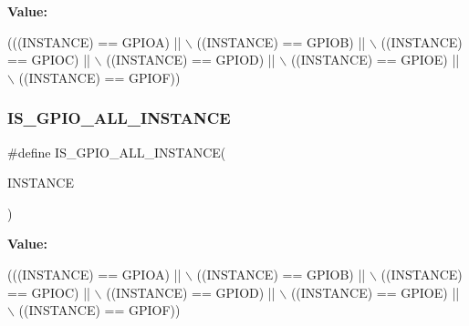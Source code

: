 {\bfseries Value\+:}
\begin{DoxyCode}
(((INSTANCE) == GPIOA) || \(\backslash\)
                                         ((INSTANCE) == GPIOB) || \(\backslash\)
                                         ((INSTANCE) == GPIOC) || \(\backslash\)
                                         ((INSTANCE) == GPIOD) || \(\backslash\)
                                         ((INSTANCE) == GPIOE) || \(\backslash\)
                                         ((INSTANCE) == GPIOF))
\end{DoxyCode}
\mbox{\label{group___exported__macro_ga783626dd2431afebea836a102e318957}} 
\subsubsection{\texorpdfstring{I\+S\+\_\+\+G\+P\+I\+O\+\_\+\+A\+L\+L\+\_\+\+I\+N\+S\+T\+A\+N\+CE}{IS\_GPIO\_ALL\_INSTANCE}\hspace{0.1cm}{\footnotesize\ttfamily [14/16]}}
{\footnotesize\ttfamily \#define I\+S\+\_\+\+G\+P\+I\+O\+\_\+\+A\+L\+L\+\_\+\+I\+N\+S\+T\+A\+N\+CE(\begin{DoxyParamCaption}\item[{}]{I\+N\+S\+T\+A\+N\+CE }\end{DoxyParamCaption})}

{\bfseries Value\+:}
\begin{DoxyCode}
(((INSTANCE) == GPIOA) || \(\backslash\)
                                         ((INSTANCE) == GPIOB) || \(\backslash\)
                                         ((INSTANCE) == GPIOC) || \(\backslash\)
                                         ((INSTANCE) == GPIOD) || \(\backslash\)
                                         ((INSTANCE) == GPIOE) || \(\backslash\)
                                         ((INSTANCE) == GPIOF))
\end{DoxyCode}
\mbox{\label{group___exported__macro_ga783626dd2431afebea836a102e318957}} 
